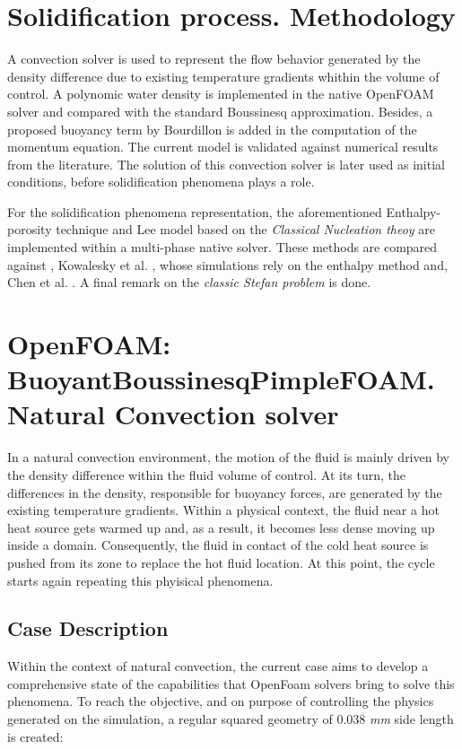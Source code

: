 \section{Solidification process. Methodology}

\setlength{\parindent}{0.5cm} A convection solver is used to represent the flow behavior generated by the density difference due to existing temperature gradients whithin the volume of control. A polynomic water density is implemented in the native OpenFOAM solver and compared with the standard Boussinesq approximation. Besides, a proposed buoyancy term by Bourdillon \cite{bourdillon_2016} is added in the computation of the momentum equation. The current model is validated against numerical results from the literature. The solution of this convection solver is later used as initial conditions, before solidification phenomena plays a role.

\noindent For the solidification phenomena representation, the aforementioned Enthalpy-porosity technique and Lee model based on the \textit{Classical Nucleation theoy} are implemented within a multi-phase native solver. These methods are compared against \cite{bourdillon_2016}, Kowalesky et al. \cite{kowalewski_rebow_1999}, whose simulations rely on the enthalpy method and, Chen et al. \cite{chen_lee_1998}. A final remark on the \textit{classic Stefan problem} is done. 

\newpage
\section{OpenFOAM: BuoyantBoussinesqPimpleFOAM. Natural Convection solver}

\setlength{\parindent}{0.5cm} In a natural convection environment, the motion of the fluid is mainly driven by the density difference within the fluid volume of control. At its turn, the differences in the density, responsible for buoyancy forces, are generated by the existing temperature gradients. Within a physical context, the fluid near a hot heat source gets warmed up and, as a result, it becomes less dense moving up inside a domain. Consequently, the fluid in contact of the cold heat source is pushed from its zone to replace the hot fluid location. At this point, the cycle starts again repeating this phyisical phenomena.

\subsection{Case Description}
\setlength{\parindent}{0.5cm} Within the context of natural convection, the current case aims to develop a comprehensive state of the capabilities that OpenFoam solvers bring to solve this phenomena. To reach the objective, and on purpose of controlling the physics generated on the simulation, a regular squared geometry of 0.038 \textit{mm} side length is created:

